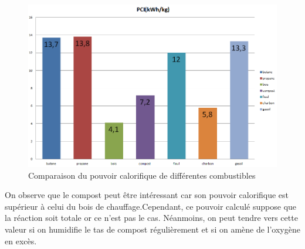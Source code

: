 \documentclass[../PS6_RapportFinal.tex]{subfiles}
\begin{document}
\begin{figure}[!h]
\begin{center}
\includegraphics[scale=0.5]{1_2_Graphique_comparaison_energie.png}
\caption{Comparaison du pouvoir calorifique de différentes combustibles}
\label{fig-ComparaisonNRJ}
\end{center}
\end{figure}

On observe que le compost peut être intéressant car son pouvoir calorifique est supérieur à celui du bois de chauffage.Cependant, ce pouvoir calculé suppose que la réaction soit totale or ce n’est pas le cas. Néanmoins, on peut tendre vers cette valeur si on humidifie le tas de compost régulièrement et si on amène de l’oxygène en excès.
\end{document}
